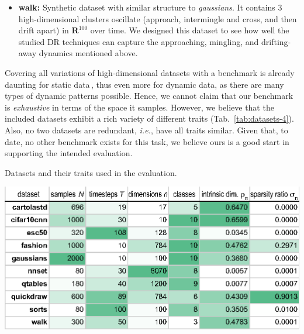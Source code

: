 \begin{itemize}
  \item \textbf{walk:} Synthetic dataset with similar structure to \emph{gaussians}. It contains 3 high-dimensional clusters oscillate (approach, intermingle and cross, and then drift apart) in $\mathbf{R}^{100}$ over time. We designed this dataset to see how well the studied DR techniques can capture the approaching, mingling, and drifting-away dynamics mentioned above.
\end{itemize}



Covering all variations of high-dimensional datasets with a benchmark is already daunting for static data\,\cite{EspadotoSurvey}, thus even more for dynamic data, as there are many types of dynamic patterns possible. Hence, we cannot claim that our benchmark is \emph{exhaustive} in terms of the space it samples. However, we believe that the included datasets exhibit a rich variety of different traits (Tab.~\ref{tab:datasets-4}). Also, no two datasets are redundant, \emph{i.e.}, have all traits similar. Given that, to date, no other benchmark exists for this task, we believe ours is a good start in supporting the intended evaluation.

\begin{table}
\centering
\caption{Datasets and their traits used in the evaluation.}
\label{tab:datasets-4}
\vspace{-0.15cm}
\includegraphics[width=.99\linewidth]{figures/projection-evaluation/datasets.eps}
\vspace{-0.15cm}
\end{table}

